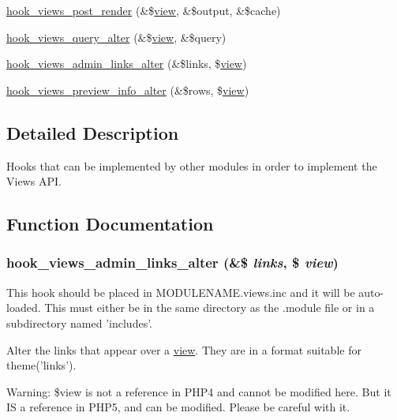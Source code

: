 \begin{CompactItemize}
\item 
\hyperlink{group__views__hooks_g21cc61642e5cafc23ec621f07dae1f4b}{hook\_\-views\_\-post\_\-render} (\&\$\hyperlink{classview}{view}, \&\$output, \&\$cache)
\item 
\hyperlink{group__views__hooks_gf4d538493930fe0fa0ce6fb3bf42c156}{hook\_\-views\_\-query\_\-alter} (\&\$\hyperlink{classview}{view}, \&\$query)
\item 
\hyperlink{group__views__hooks_ge8633ca67e214bf3e676eb032c06b395}{hook\_\-views\_\-admin\_\-links\_\-alter} (\&\$links, \$\hyperlink{classview}{view})
\item 
\hyperlink{group__views__hooks_gfeafa28dd3e140b2d4f8cfdfc7d76922}{hook\_\-views\_\-preview\_\-info\_\-alter} (\&\$rows, \$\hyperlink{classview}{view})
\end{CompactItemize}


\subsection{Detailed Description}
Hooks that can be implemented by other modules in order to implement the Views API. 

\subsection{Function Documentation}
\hypertarget{group__views__hooks_ge8633ca67e214bf3e676eb032c06b395}{
\subsubsection[{hook\_\-views\_\-admin\_\-links\_\-alter}]{\setlength{\rightskip}{0pt plus 5cm}hook\_\-views\_\-admin\_\-links\_\-alter (\&\$ {\em links}, \/  \$ {\em view})}}
\label{group__views__hooks_ge8633ca67e214bf3e676eb032c06b395}


This hook should be placed in MODULENAME.views.inc and it will be auto-loaded. This must either be in the same directory as the .module file or in a subdirectory named 'includes'.

Alter the links that appear over a \hyperlink{classview}{view}. They are in a format suitable for theme('links').

Warning: \$view is not a reference in PHP4 and cannot be modified here. But it IS a reference in PHP5, and can be modified. Please be careful with it.

